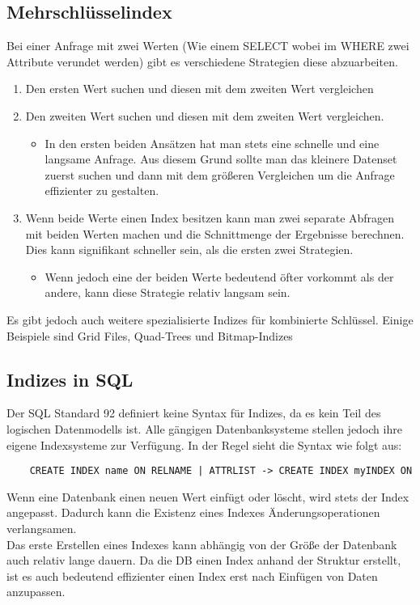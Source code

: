 \documentclass{article}
\begin{document}
	\subsection{Mehrschlüsselindex}
	Bei einer Anfrage mit zwei Werten (Wie einem SELECT wobei im WHERE zwei Attribute verundet werden) gibt es verschiedene Strategien diese abzuarbeiten.
	\begin{enumerate}
		\item{Den ersten Wert suchen und diesen mit dem zweiten Wert vergleichen}
		\item{Den zweiten Wert suchen und diesen mit dem zweiten Wert vergleichen.}
		\begin{itemize}
			\item{In den ersten beiden Ansätzen hat man stets eine schnelle und eine langsame Anfrage. Aus diesem Grund sollte man das kleinere Datenset zuerst suchen und dann mit dem größeren Vergleichen um die Anfrage effizienter zu gestalten.}
		\end{itemize}
		\item{Wenn beide Werte einen Index besitzen kann man zwei separate Abfragen mit beiden Werten machen und die Schnittmenge der Ergebnisse berechnen. Dies kann signifikant schneller sein, als die ersten zwei Strategien.}
		\begin{itemize}
			\item{Wenn jedoch eine der beiden Werte bedeutend öfter vorkommt als der andere, kann diese Strategie relativ langsam sein.}
		\end{itemize}
	\end{enumerate}
	Es gibt jedoch auch weitere spezialisierte Indizes für kombinierte Schlüssel. Einige Beispiele sind Grid Files, Quad-Trees und Bitmap-Indizes 
	\subsection{Indizes in SQL}
	Der SQL Standard 92 definiert keine Syntax für Indizes, da es kein Teil des logischen Datenmodells ist. Alle gängigen Datenbanksysteme stellen jedoch ihre eigene Indexsysteme zur Verfügung. In der Regel sieht die Syntax wie folgt aus:
	\begin{verbatim}
	CREATE INDEX name ON RELNAME | ATTRLIST -> CREATE INDEX myINDEX ON
	\end{verbatim}
	Wenn eine Datenbank einen neuen Wert einfügt oder löscht, wird stets der Index angepasst. Dadurch kann die Existenz eines Indexes Änderungsoperationen verlangsamen. \\
	Das erste Erstellen eines Indexes kann abhängig von der Größe der Datenbank auch relativ lange dauern. Da die DB einen Index anhand der Struktur erstellt, ist es auch bedeutend effizienter einen Index erst nach Einfügen von Daten anzupassen.













	
\end{document}
